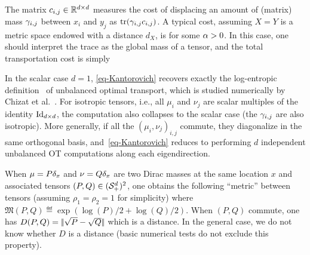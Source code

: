 The matrix $c_{i,j} \in \mathbb{R}^{d \times d}$ measures the cost of displacing an amount of (matrix) mass $\gamma_{i,j}$ between $x_i$ and $y_j$  as $\operatorname{tr}(\gamma_{i,j}c_{i,j})$. %
%
A typical cost, assuming $X=Y$ is a metric space endowed with a distance $d_X$, is
for some $\alpha>0$.  In this case, one should interpret the trace as the global mass of a tensor, and the total transportation cost is simply 


\begin{rem}[Classical OT]\label{rem-classical-ot}
	In the scalar case $d=1$, \eqref{eq-Kantorovich} recovers exactly the log-entropic definition~\cite{LieroMielkeSavareLong} of unbalanced optimal transport, which is studied numerically by Chizat et al.~. %
	For isotropic tensors, i.e., all $\mu_i$ and $\nu_j$ are scalar multiples of the identity $\mathrm{Id}_{d \times d}$, the computation also collapses to the scalar case (the $\gamma_{i,j}$ are also isotropic). More generally, if all the $(\mu_i,\nu_j)_{i,j}$ commute, they diagonalize in the same orthogonal basis, and~\eqref{eq-Kantorovich} reduces to performing $d$ independent unbalanced OT computations along each eigendirection. 
\end{rem}

\begin{rem}
	When $\mu=P \delta_{x}$ and $\nu=Q \delta_{x}$ are two Dirac masses at the same location $x$ and associated tensors $(P,Q) \in (\mathcal{S}_{+}^d)^2$,
	one obtains the following ``metric'' between tensors (assuming $\rho_1=\rho_2=1$ for simplicity)
	where $\mathfrak{M}(P,Q) \eqdef \exp(\log(P)/2+\log(Q)/2)$.
	When $(P,Q)$ commute, one has $D(P,Q) = |\!| \sqrt{P}-\sqrt{Q} |\!|$ which is a distance.
	In the general case, we do not know whether $D$ is a distance (basic numerical tests do not exclude this property).
	
%	
\end{rem}


